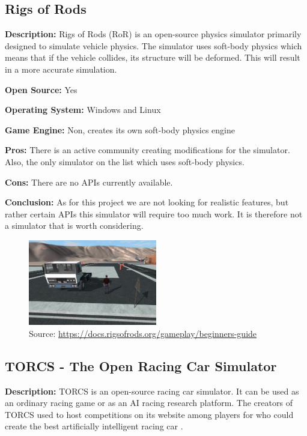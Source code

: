 \subsection{Rigs of Rods}
\textbf{Description:} Rigs of Rods (RoR) is an open-source physics simulator primarily designed to simulate vehicle physics. The simulator uses soft-body physics which means that if the vehicle collides, its structure will be deformed. This will result in a more accurate simulation.

\textbf{Open Source:} Yes

\textbf{Operating System:} Windows and Linux

\textbf{Game Engine:} Non, creates its own soft-body physics engine

\textbf{Pros:} There is an active community creating modifications for the simulator. Also, the only simulator on the list which uses soft-body physics. 

\textbf{Cons:} There are no APIs currently available. 

\textbf{Conclusion:} As for this project we are not looking for realistic features, but rather certain APIs this simulator will require too much work. It is therefore not a simulator that is worth considering. 

\begin{figure}[H]
    \centering
    \includegraphics[width=0.5\textwidth]{Simulators/RoR.png}
    \caption{Source: \url{https://docs.rigsofrods.org/gameplay/beginners-guide}}
\end{figure}


\subsection{TORCS - The Open Racing Car Simulator}
\textbf{Description:} TORCS is an open-source racing car simulator. It can be used as an ordinary racing game or as an AI racing research platform. The creators of TORCS used to host competitions on its website among players for who could create the best artificially intelligent racing car \cite{TORCS_Racing}. 

